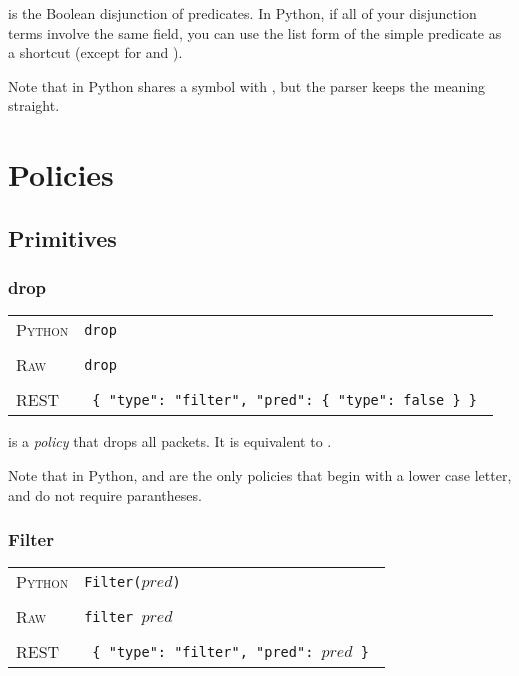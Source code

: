 is the Boolean disjunction of predicates.  In Python, if all of your disjunction terms involve
the same field, you can use the list form of the simple predicate as a shortcut (except for 
 and ). 

Note that in Python  shares a symbol with , but the parser keeps the meaning straight.

\section{Policies}

\subsection{Primitives}

\subsubsection{drop}

\bigskip
\begin{tabularx}{\linewidth}{lX}
\textsc{Python}   & \texttt{drop} \\ \\
\textsc{Raw}   & \texttt{drop} \\ \\
\textsc{REST} & \texttt{ \{ "type": "filter", "pred": \{ "type": false \} \} } 
\end{tabularx}

 is a \emph{policy} that drops all packets.  It is equivalent to .

Note that in Python,  and  are the only policies that begin with a lower case
letter, and do not require parantheses.  

\subsubsection{Filter}

\bigskip
\begin{tabularx}{\linewidth}{lX}
\textsc{Python}   & \texttt{Filter($pred$)} \\ \\
\textsc{Raw}   & \texttt{filter $pred$} \\ \\
\textsc{REST} & \texttt{ \{ "type": "filter", "pred": $pred$ \} } 
\end{tabularx}

